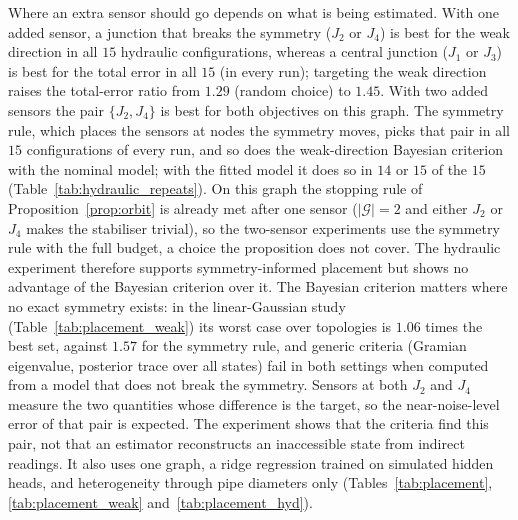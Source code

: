 \documentclass[conference]{IEEEtran}
\begin{document}
Where an extra sensor should go depends on what is being estimated. With one added sensor, a junction that breaks the symmetry ($J_2$ or $J_4$) is best for the weak direction in all $15$ hydraulic configurations, whereas a central junction ($J_1$ or $J_3$) is best for the total error in all $15$ (in every run); targeting the weak direction raises the total-error ratio from $1.29$ (random choice) to $1.45$. With two added sensors the pair $\{J_2,J_4\}$ is best for both objectives on this graph. The symmetry rule, which places the sensors at nodes the symmetry moves, picks that pair in all $15$ configurations of every run, and so does the weak-direction Bayesian criterion with the nominal model; with the fitted model it does so in $14$ or $15$ of the $15$ (Table~\ref{tab:hydraulic_repeats}). On this graph the stopping rule of Proposition~\ref{prop:orbit} is already met after one sensor ($|\mathcal G|=2$ and either $J_2$ or $J_4$ makes the stabiliser trivial), so the two-sensor experiments use the symmetry rule with the full budget, a choice the proposition does not cover. The hydraulic experiment therefore supports symmetry-informed placement but shows no advantage of the Bayesian criterion over it. The Bayesian criterion matters where no exact symmetry exists: in the linear-Gaussian study (Table~\ref{tab:placement_weak}) its worst case over topologies is $1.06$ times the best set, against $1.57$ for the symmetry rule, and generic criteria (Gramian eigenvalue, posterior trace over all states) fail in both settings when computed from a model that does not break the symmetry. Sensors at both $J_2$ and $J_4$ measure the two quantities whose difference is the target, so the near-noise-level error of that pair is expected. The experiment shows that the criteria find this pair, not that an estimator reconstructs an inaccessible state from indirect readings. It also uses one graph, a ridge regression trained on simulated hidden heads, and heterogeneity through pipe diameters only (Tables~\ref{tab:placement}, \ref{tab:placement_weak} and~\ref{tab:placement_hyd}).
\end{document}
